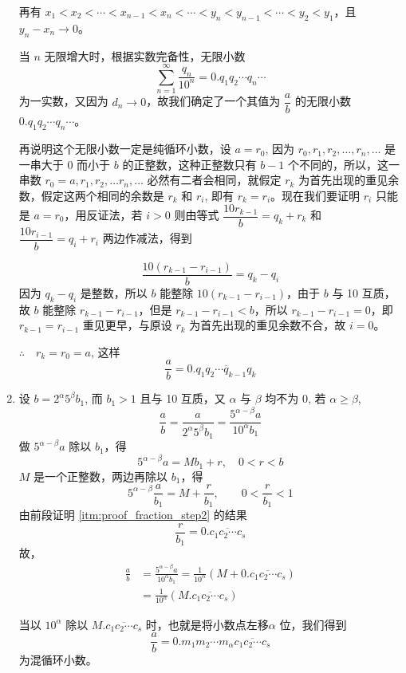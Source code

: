 \begin{enumerate}
再有 $x_1<x_2<\cdots<x_{n-1}<x_n<\cdots<y_n<y_{n-1}<\cdots<y_2<y_1$，且 $y_n-x_n\to 0$。

当 $n$ 无限增大时，根据实数完备性，无限小数
\[\sum_{n=1}^{\infty}\frac{q_n}{10^n}=0.q_1q_2\cdots q_n\cdots\]
为一实数，又因为 $d_n\to 0$，故我们确定了一个其值为 $\dfrac{a}{b}$ 的无限小数 $0.q_1q_2\cdots q_n\cdots$。

\medskip
{\linespread{1.4}\selectfont
再说明这个无限小数一定是纯循环小数，设 $a=r_0$, 因为
$r_0,r_1,r_2,\ldots,r_n,\ldots$ 是一串大于 0 而小于 $b$ 的正整数，这种正整数只有 $b-1$ 个不同的，所以，这一串数 $r_0=a,r_1,r_2,\ldots r_n,\ldots$ 必然有二者会相同，就假定 $r_k$ 为首先出现的重见余数，假定这两个相同的余数是 $r_k$ 和 $r_i$, 即有 $r_k=r_i$。现在我们要证明 $r_i$ 只能是 $a=r_0$，用反证法，若 $i>0$ 则由等式
$\dfrac{10r_{k-1}}{b}=q_k+r_k$ 和 $\dfrac{10r_{i-1}}{b}=q_i+r_i$ 两边作减法，得到\par}
\[\frac{10(r_{k-1}-r_{i-1})}{b}=q_k-q_i\]
因为 $q_k-q_i$ 是整数，所以 $b$ 能整除 $10(r_{k-1}-r_{i-1})$，由于 $b$ 与 10
互质，故 $b$ 能整除 $r_{k-1}-r_{i-1}$，但是 $r_{k-1}-r_{i-1}<b$，所以 $r_{k-1}-r_{i-1}=0$，即 $r_{k-1}=r_{i-1}$ 重见更早，与原设 $r_k$ 为首先出现的重见余数不合，故 $i=0$。

$\therefore\quad r_k=r_0=a$, 这样
\[\frac{a}{b}=0.\overline{q_1q_2\cdots q_{k-1}q_k}\]

\item 设 $b=2^{\alpha}5^{\beta}b_1$, 而 $b_1>1$ 且与 10 互质，又 $\alpha$ 与 $\beta$ 均不为 0, 若 $\alpha\geqslant \beta$,
\[\frac{a}{b}=\frac{a}{2^{\alpha}5^{\beta}b_1}=\frac{5^{\alpha-\beta}a}{10^{\alpha}b_1}\]
做 $5^{\alpha-\beta}a$ 除以 $b_1$，得
\[5^{\alpha-\beta}a=M{b_1}+{r},\quad 0<r<b\]
$M$ 是一个正整数，两边再除以 $b_1$，得
\[5^{\alpha-\beta}\frac{a}{b_1}=M+\frac{r}{b_1},\qquad 0<\frac{r}{b_1}<1\]
由前段证明 \ref{itm:proof_fraction_step2} 的结果
\[\frac{r}{b_1}=0.\overline{c_1c_2\cdots c_{s}}\]
故，
\[\begin{split}
    \frac{a}{b}&=\frac{5^{\alpha-\beta}a}{10^{\alpha}b_1}=\frac{1}{10^{\alpha}}\left(M+0.\overline{c_1c_2\cdots c_{s}}\right)\\
    &=\frac{1}{10^{\alpha}}\left(M.\overline{c_1c_2\cdots c_{s}}\right)
\end{split}\]

当以 $10^{\alpha}$ 除以 $M.\overline{c_1c_2\cdots c_{s}}$ 时，也就是将小数点左移$\alpha$ 位，我们得到
\[\frac{a}{b}=0.m_1m_2\cdots m_{\alpha}\overline{c_1c_2\cdots c_{s}}\]
为混循环小数。
\end{enumerate}

